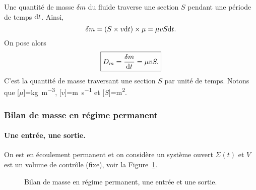             Une quantité de masse $\delta m$ du fluide traverse une section $S$ pendant une période de temps $\mathrm{d} t$. Ainsi,
            \begin{equation*}
                \delta m=(S\times v\mathrm{d} t)\times\mu=\mu v S\mathrm{d} t.
            \end{equation*}
            On pose alors 
            \begin{equation*}
                \boxed{
                    D_m=\frac{\delta m}{\mathrm{d} t}=\mu v S.
                }
            \end{equation*}
            C'est la quantité de masse traversant une section $S$ par unité de temps. Notons que [$\mu$]=\si[]{\kilogram\per\metre\cubed}, [$v$]=\si[]{\metre\per\second} et [$S$]=\si[]{\metre\squared}.

        \subsubsection{Bilan de masse en régime permanent}

            \paragraph{Une entrée, une sortie.}

                On est en écoulement permanent et on considère un système ouvert $\Sigma(t)$ et $V$ est un volume de contrôle (fixe), voir la Figure~\ref{fig:bilan_masse_regime_permanent_une_entree_une_sortie}.

                \begin{figure}
                    \centering
                    \caption{Bilan de masse en régime permanent, une entrée et une sortie.}    
                    \label{fig:bilan_masse_regime_permanent_une_entree_une_sortie}
                \end{figure}

